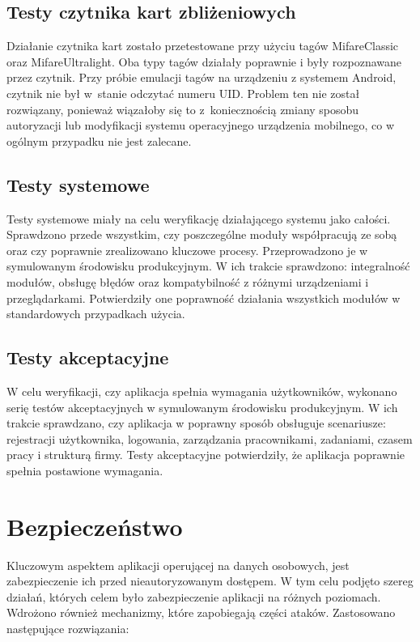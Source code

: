 \subsection{Testy czytnika kart zbliżeniowych}

Działanie czytnika kart zostało przetestowane przy użyciu tagów MifareClassic oraz MifareUltralight. Oba typy tagów działały poprawnie i były rozpoznawane przez czytnik. Przy próbie emulacji tagów na urządzeniu z systemem Android, czytnik nie był w~stanie odczytać numeru UID. Problem ten nie został rozwiązany, ponieważ wiązałoby się to z~koniecznością zmiany sposobu autoryzacji lub modyfikacji systemu operacyjnego urządzenia mobilnego, co w ogólnym przypadku nie jest zalecane.

\subsection{Testy systemowe}

Testy systemowe miały na celu weryfikację działającego systemu jako całości. Sprawdzono przede wszystkim, czy poszczególne moduły współpracują ze sobą oraz czy poprawnie zrealizowano kluczowe procesy. Przeprowadzono je w symulowanym środowisku produkcyjnym. W ich trakcie sprawdzono: integralność modułów, obsługę błędów oraz kompatybilność z różnymi urządzeniami i przeglądarkami. Potwierdziły one poprawność działania wszystkich modułów w standardowych przypadkach użycia.

\subsection{Testy akceptacyjne}

W celu weryfikacji, czy aplikacja spełnia wymagania użytkowników, wykonano serię testów akceptacyjnych w symulowanym środowisku produkcyjnym. W ich trakcie sprawdzano, czy aplikacja w poprawny sposób obsługuje scenariusze: rejestracji użytkownika, logowania, zarządzania pracownikami, zadaniami, czasem pracy i strukturą firmy. Testy akceptacyjne potwierdziły, że aplikacja poprawnie spełnia postawione wymagania.

\section{Bezpieczeństwo}

Kluczowym aspektem aplikacji operującej na danych osobowych, jest zabezpieczenie ich przed nieautoryzowanym dostępem. W tym celu podjęto szereg działań, których celem było zabezpieczenie aplikacji na różnych poziomach. Wdrożono również mechanizmy, które zapobiegają części ataków. Zastosowano następujące rozwiązania:

